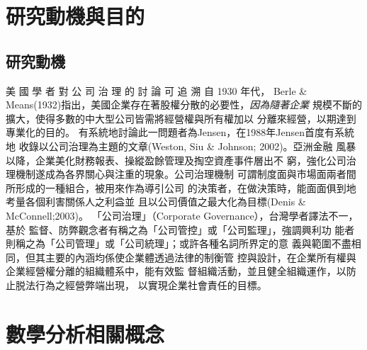 \documentclass[writingLanguage=chinese,
    addPageTitle=on,
    addDeclaration=on,
    addMUSTlog=off,
    addFigTOC=on,   
    addTabTOC=on,
    refIndent=on,
    printMod=off,
]{.def/must}
\begin{document}
\section{研究動機與目的}
\txtHere{[1]}
\citep{luey2013, turabian2015, WangZhenWu2004, WenZaoWai2009, QiuZiHeng2017, HeDingZhao2019, WuPeiHua2020, QiuJiongYou2014, QiuJiongYou2016, QiuJiongYou2019, LinDongTai2008, LinJing2018, LinWenYao2018, LinXHui2014, HongWenQi2019, HongZhenZhou2018, ChenYaNing9999, ChenXiaMin2019, ZhangYan2016, GuoJiaTu2019, WenDaMao2015, JianYiLing2019, abdoh2019, bordwell2013, bourdieu1990, Co2020, cohen2007, cole2013, deliot2014, foster2017, giles2019, harvey2007, johnson2018, macdonald2020, manguel2009, Milliot2020, paige2017, poff2019, šteger2010, TaiwanNews2019, Villazon2011, wipawin2018}

\subsection{研究動機}
美 國 學 者 對 公 司 治 理 的 討 論 可 追 溯 自 1930 年代， Berle \&
Means(1932)指出，美國企業存在著股權分散的必要性，\textit{因為隨著企業}
規模不斷的擴大，使得多數的中大型公司皆需將經營權與所有權加以
分離來經營，以期達到專業化的目的。
有系統地討論此一問題者為Jensen，在1988年Jensen首度有系統地
收錄以公司治理為主題的文章(Weston, Siu \& Johnson; 2002)。亞洲金融
風暴以降，企業美化財務報表、操縱盈餘管理及掏空資產事件層出不
窮，強化公司治理機制遂成為各界關心與注重的現象。公司治理機制
可謂制度面與市場面兩者間所形成的一種組合，被用來作為導引公司
的決策者，在做決策時，能面面俱到地考量各個利害關係人之利益並
且以公司價值之最大化為目標(Denis \& McConnell;2003)。
「公司治理」（Corporate Governance），台灣學者譯法不一，基於
監督、防弊觀念者有稱之為「公司管控」或「公司監理」，強調興利功
能者則稱之為「公司管理」或「公司統理」；或許各種名詞所界定的意
義與範圍不盡相同，但其主要的內涵均係使企業體透過法律的制衡管
控與設計，在企業所有權與企業經營權分離的組織體系中，能有效監
督組織活動，並且健全組織運作，以防止脱法行為之經營弊端出現，
以實現企業社會責任的目標。




 



\section{數學分析相關概念}
\end{document}
